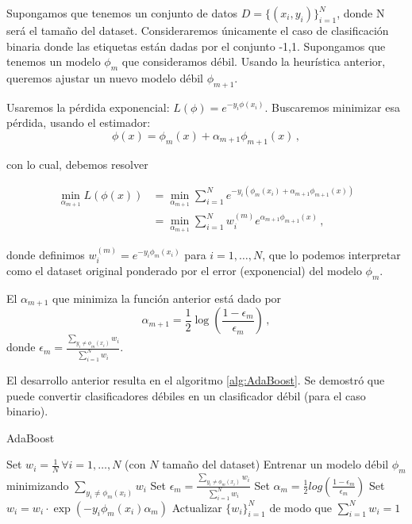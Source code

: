 Supongamos que tenemos un conjunto de datos $D = \{(x_i,y_i)\}^N_{i=1}$, donde N será el tamaño del dataset. Consideraremos únicamente el caso de clasificación binaria donde las etiquetas están dadas por el conjunto {-1,1}. Supongamos que tenemos un modelo $\phi_m$ que consideramos débil. Usando la heurística anterior, queremos ajustar un nuevo modelo débil $\phi_{m+1}$.

Usaremos la pérdida exponencial: $L(\phi) = e^{-y_i \phi(x_i)}$. Buscaremos minimizar esa pérdida, usando el estimador:
$$ \phi(x) = \phi_m(x) + \alpha_{m+1}\phi_{m+1}(x)\,, $$

con lo cual, debemos resolver

\begin{align}
    \min_{\alpha_{m+1}} L(\phi(x)) & = \min_{\alpha_{m+1}} \sum^N_{i=1} e^{-y_i (\phi_m(x_i) + \alpha_{m+1} \phi_{m+1}(x))} \\
    & = \min_{\alpha_{m+1}} \sum^N_{i=1} w_i^{(m)} e^{\alpha_{m+1} \phi_{m+1}(x)} \,,
\end{align}

donde definimos $w_i^{(m)} = e^{-y_i \phi_m(x_i)}$ para $i = 1,\dots,N$, que lo podemos interpretar como el dataset original ponderado por el error (exponencial) del modelo $\phi_m$.

\begin{lemma}
    El $\alpha_{m+1}$ que minimiza la función anterior está dado por
    \begin{equation}
        \alpha_{m+1} = \frac{1}{2} \log(\frac{1-\epsilon_m}{\epsilon_m})\,,
    \end{equation}
    donde  $\epsilon_m = \displaystyle \frac{ \sum_{y_i \neq \phi_m(x_i)} w_i}{\sum_{i=1}^N w_i} $.
\end{lemma}

El desarrollo anterior resulta en el algoritmo \ref{alg:AdaBoost}. Se demostró que puede convertir clasificadores débiles en un clasificador débil (para el caso binario).

\begin{algorithm}[H]
  \caption{AdaBoost
    \label{alg:AdaBoost}}
  \begin{algorithmic}[1]
  \State Set $w_i = \frac{1}{N}\,\forall i=1,\dots,N$ (con $N$ tamaño del dataset)
        \State Entrenar un modelo débil $\phi_m$  minimizando $\displaystyle \sum_{y_i \neq \phi_m(x_i)} w_i$
        \State Set $\epsilon_m = \displaystyle \frac{ \sum_{y_i \neq \phi_m(x_i)} w_i}{\sum_{i=1}^N w_i}$
        \State Set $\alpha_{m} = \frac{1}{2} log(\frac{1 - \epsilon_m}{\epsilon_m})$
        \State Set $w_i = w_i \cdot \exp(-y_i \phi_m(x_i) \alpha_m)$ %
        \State Actualizar $\{w_i\}^N_{i=1}$ de modo que $\sum^N_{i=1} w_i = 1$
    \EndFor
    \EndFunction
  \end{algorithmic}
\end{algorithm}

